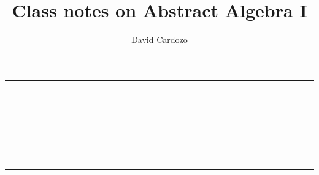 \documentclass[notitlepage]{article}
\author{David Cardozo}
\title{Class notes on Abstract Algebra I}
\begin{document}



\noindent\rule{\textwidth}{1pt}\\[-0.1cm]


\noindent\rule{\textwidth}{1pt}\\[-0.1cm]
	

\noindent\rule{\textwidth}{1pt}\\[-0.1cm]


\noindent\rule{\textwidth}{1pt}\\[-0.1cm]



	
\end{document}
